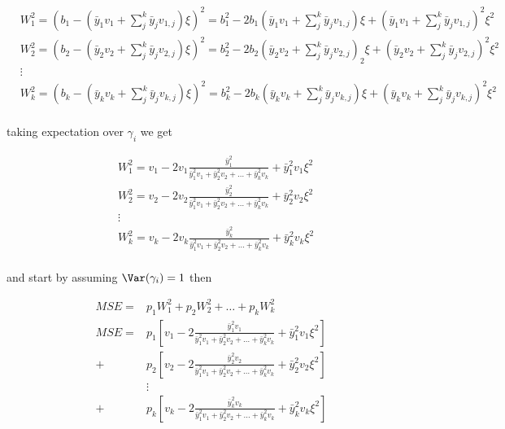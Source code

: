 \begin{align*}
		  &W_1^2=  \left( b_1 -  (\bar{y}_{1} v_{1} + \sum_{j}^{k} \bar{y}_j v_{1,j} ) \xi \right)^2 = b_1^2 - 2 b_1 (\bar{y}_{1} v_{1} + \sum_{j}^{k} \bar{y}_j v_{1,j} ) \xi + (\bar{y}_{1} v_{1} + \sum_{j}^{k} \bar{y}_j v_{1,j} )^2 \xi^2 \\
		  &W_2^2= \left( b_2 -  (\bar{y}_{2} v_{2} + \sum_{j}^{k} \bar{y}_j v_{2,j} ) \xi \right)^2 = b_2^2 - 2 b_2 (\bar{y}_{2} v_{2} + \sum_{j}^{k} \bar{y}_j v_{2,j} )_2 \xi + (\bar{y}_{2} v_{2} + \sum_{j}^{k} \bar{y}_j v_{2,j} )^2 \xi^2 \\
		  & \vdots \\
		  &W_k^2 = \left( b_k - (\bar{y}_{k} v_{k} + \sum_{j}^{k} \bar{y}_j v_{k,j} ) \xi \right)^2 = b_k^2 - 2 b_k(\bar{y}_{k} v_{k} + \sum_{j}^{k} \bar{y}_j v_{k,j} ) \xi  + (\bar{y}_{k} v_{k} + \sum_{j}^{k} \bar{y}_j v_{k,j} )^2 \xi^2 \\
\end{align*} 

taking expectation over $\gamma_i$ we get

\begin{align*}
		  &W_1^2=  v_1 - 2 v_1 \frac{\bar{y}_1^2 }{\bar{y}_1^2 v_1 + \bar{y}_2^2 v_2 + \ldots + \bar{y}_k^2 v_k} + \bar{y}_1^2 v_1 \xi^2 \\
		  &W_2^2=  v_2 - 2 v_2 \frac{\bar{y}_2^2 }{\bar{y}_1^2 v_1 + \bar{y}_2^2 v_2 + \ldots + \bar{y}_k^2 v_k} + \bar{y}_2^2 v_2 \xi^2 \\
		  & \vdots \\
		  &W_k^2=  v_k - 2 v_k \frac{\bar{y}_k^2 }{\bar{y}_1^2 v_1 + \bar{y}_2^2 v_2 + \ldots + \bar{y}_k^2 v_k} + \bar{y}_k^2 v_k \xi^2 \\
\end{align*}

and start by assuming $\Var(\gamma_i) = 1$ then

\begin{align*}
	MSE = &p_1 W_1^2 + p_2 W_2^2 + \ldots + p_k W_k^2 \\
	MSE = &p_1[v_1 - 2 \frac{\bar{y}_1^2 v_1}{\bar{y}_1^2 v_1 + \bar{y}_2^2 v_2 + \ldots + \bar{y}_k^2 v_k}+ \bar{y}_1^2 v_1 \xi^2] \\
	  + &p_2[v_2 - 2 \frac{\bar{y}_2^2 v_2}{\bar{y}_1^2 v_1 + \bar{y}_2^2 v_2 + \ldots + \bar{y}_k^2 v_k}+ \bar{y}_2^2 v_2 \xi^2 ] \\ 
	  & \vdots \\
	 + &p_k [v_k -2 \frac{\bar{y}_k^2 v_k}{\bar{y}_1^2 v_1 + \bar{y}_2^2 v_2 + \ldots + \bar{y}_k^2 v_k} + \bar{y}_k^2 v_k \xi^2] \\
\end{align*}

